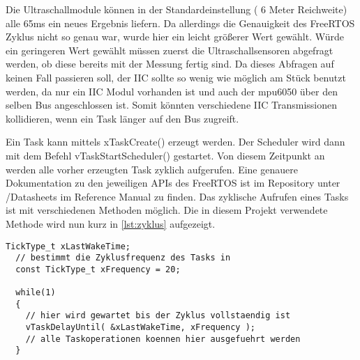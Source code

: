 Die Ultraschallmodule können in der Standardeinstellung ( 6 Meter Reichweite) alle 65ms ein neues Ergebnis liefern. Da allerdings die Genauigkeit des FreeRTOS Zyklus nicht so genau war, wurde hier ein leicht größerer Wert gewählt. Würde ein geringeren Wert gewählt müssen zuerst die Ultraschallsensoren abgefragt werden, ob diese bereits mit der Messung fertig sind. Da dieses Abfragen auf keinen Fall passieren soll, der IIC sollte so wenig wie möglich am Stück benutzt werden, da nur ein IIC Modul vorhanden ist und auch der mpu6050 über den selben Bus angeschlossen ist. Somit könnten verschiedene IIC Transmissionen kollidieren, wenn ein Task länger auf den Bus zugreift.


Ein Task kann mittels xTaskCreate() erzeugt werden. Der Scheduler wird dann mit dem Befehl vTaskStartScheduler() gestartet. Von diesem Zeitpunkt an werden alle vorher erzeugten Task zyklich aufgerufen. Eine genauere Dokumentation zu den jeweiligen APIs des FreeRTOS ist im Repository unter /Datasheets im Reference Manual zu finden. Das zyklische Aufrufen eines Tasks ist mit verschiedenen Methoden möglich. Die in diesem Projekt verwendete Methode wird nun kurz in \ref{lst:zyklus} aufgezeigt.

\begin{lstlisting}[caption={Taskzyklus erzeugen}, label=lst:zyklus]
  TickType_t xLastWakeTime;
  // bestimmt die Zyklusfrequenz des Tasks in
  const TickType_t xFrequency = 20;

  while(1)
  {
    // hier wird gewartet bis der Zyklus vollstaendig ist
    vTaskDelayUntil( &xLastWakeTime, xFrequency );
    // alle Taskoperationen koennen hier ausgefuehrt werden
  }
\end{lstlisting}



